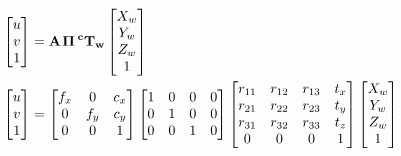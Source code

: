 \documentclass{article}
\begin{document}
\[  \begin{align*}
  \begin{bmatrix}
  u \\
  v \\
  1
  \end{bmatrix} &=
  \bf{A} \hspace{0.1em} \Pi \hspace{0.2em} ^{c}\bf{T}_w
  \begin{bmatrix}
  X_{w} \\
  Y_{w} \\
  Z_{w} \\
  1
  \end{bmatrix} \\
  \begin{bmatrix}
  u \\
  v \\
  1
  \end{bmatrix} &=
  \begin{bmatrix}
  f_x & 0 & c_x \\
  0 & f_y & c_y \\
  0 & 0 & 1
  \end{bmatrix}
  \begin{bmatrix}
  1 & 0 & 0 & 0 \\
  0 & 1 & 0 & 0 \\
  0 & 0 & 1 & 0
  \end{bmatrix}
  \begin{bmatrix}
  r_{11} & r_{12} & r_{13} & t_x \\
  r_{21} & r_{22} & r_{23} & t_y \\
  r_{31} & r_{32} & r_{33} & t_z \\
  0 & 0 & 0 & 1
  \end{bmatrix}
  \begin{bmatrix}
  X_{w} \\
  Y_{w} \\
  Z_{w} \\
  1
  \end{bmatrix}
  \end{align*}
\]
\pagebreak
\end{document}
